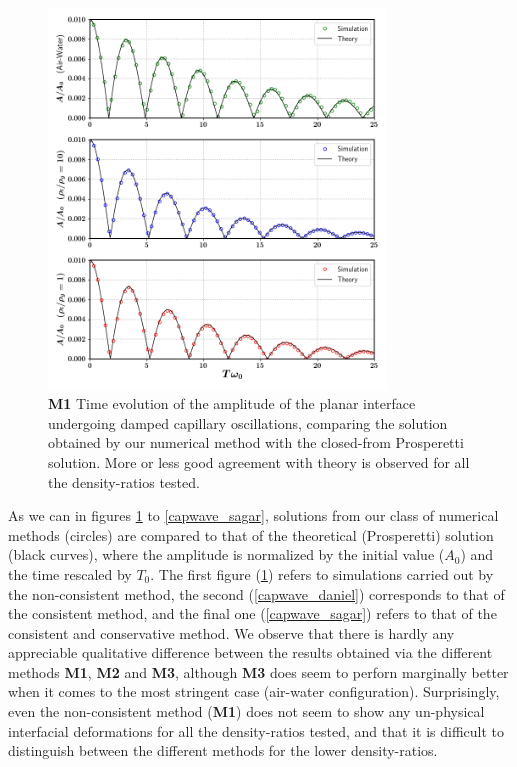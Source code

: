 \begin{figure}[h!]
    \centering
    \includegraphics[width = 0.8\textwidth]{plots/capwave/compare_nonmc.png}
	\caption{\textbf{M1} Time evolution of the amplitude of the planar interface undergoing damped capillary oscillations, comparing the solution obtained by our numerical method with the closed-from Prosperetti solution. More or less good agreement with theory is observed for all the density-ratios tested. }
    \label{capwave_nonmc}
\end{figure}

As we can in figures \ref{capwave_nonmc} to \ref{capwave_sagar}, solutions from our class of numerical methods (circles) are compared to that of the theoretical (Prosperetti) solution (black curves), where the amplitude is normalized by the initial value ($A_0$) and the time rescaled by $T_0$. The first figure (\ref{capwave_nonmc}) refers to simulations carried out by the non-consistent method, the second (\ref{capwave_daniel}) corresponds to that of the consistent method, and the final one (\ref{capwave_sagar}) refers to that of the consistent and conservative method. We observe that there is hardly any appreciable qualitative difference between the results obtained via the different methods \textbf{M1}, \textbf{M2} and \textbf{M3}, although \textbf{M3} does seem to perforn marginally better when it comes to the most stringent case (air-water configuration). Surprisingly, even the non-consistent method (\textbf{M1}) does not seem to show any un-physical interfacial deformations for all the density-ratios tested, and that it is difficult to distinguish between the different methods for the lower density-ratios.  

